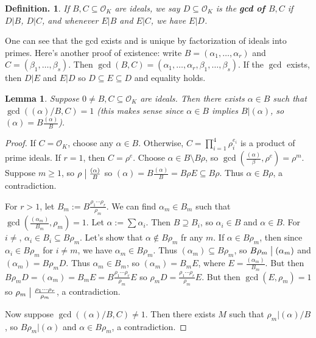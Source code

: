\documentclass[11pt, a4paper]{memoir}
\renewcommand{\div}{\bigm|}
\theoremstyle{change}
\newtheorem{lemma}[theorem]{Lemma}
\theoremstyle{plain}
\theoremstyle{nonumberplain}
\newtheorem{definition}{Definition.}
\newtheorem{proof}{Proof}
\begin{document}
\begin{definition}
    If $B,C\subseteq\mathcal{O}_K$ are ideals, we say $D\subseteq\mathcal{O}_K$ is the \textbf{gcd of $B,C$} if $D|B$, $D|C$, and whenever $E|B$ and $E|C$, we have $E|D$.
\end{definition}
One can see that the gcd exists and is unique by factorization of ideals into primes.
Here's another proof of existence: write $B=(\alpha_1,\ldots,\alpha_r)$ and $C=(\beta_1,\ldots,\beta_s)$.
Then $\gcd(B,C)=(\alpha_1,\ldots,\alpha_r,\beta_1,\ldots,\beta_s)$.
If the $\gcd$ exists, then $D|E$ and $E|D$ so $D\subseteq E\subseteq D$ and equality holds.
\begin{lemma}
    Suppose $0\neq B,C\subseteq\mathcal{O}_K$ are ideals.
    Then there exists $\alpha\in B$ such that $\gcd((\alpha)/B,C)=1$ (this makes sense since $\alpha\in B$ implies $B|(\alpha)$, so $(\alpha)=B\frac{(\alpha)}{B}$).
\end{lemma}
\begin{proof}
    If $C=\mathcal{O}_K$, choose any $\alpha\in B$.
    Otherwise, $C=\prod_{i=1}^4\rho_i^{e_i}$ is a product of prime ideals.
    If $r=1$, then $C=\rho^e$.
    Choose $\alpha\in B\setminus B\rho$, so $\gcd\left(\frac{(\alpha)}{\beta},\rho^e\right)=\rho^m$.
    Suppose $m\geq 1$, so $\rho\div\frac{(\alpha)}{B}$ so $(\alpha)=B\frac{(\alpha)}{B}=B\rho E\subseteq B\rho$.
    Thus $\alpha\in B\rho$, a contradiction.

    For $r>1$, let $B_m:=B\frac{\rho_1\cdots\rho_r}{\rho_m}$.
    We can find $\alpha_m\in B_m$ such that $\gcd\left(\frac{(\alpha_m)}{B_m},\rho_m\right)=1$.
    Let $\alpha:=\sum\alpha_i$.
    Then $B\supseteq B_i$, so $\alpha_i\in B$ and $\alpha\in B$.
    For $i\neq $, $\alpha_i\in B_i\subseteq B\rho_m$.
    Let's show that $\alpha\notin B\rho_m$ fr any $m$.
    If $\alpha\in B\rho_m$, then since $\alpha_i\in B\rho_m$ for $i\neq m$, we have $\alpha_m\in B\rho_m$.
    Thus $(\alpha_m)\subseteq B\rho_m$, so $B\rho_m\div(\alpha_m)$ and $(\alpha_m)=B\rho_mD$.
    Thus $\alpha_m\in B_m$, so $(\alpha_m)=B_mE$, where $E=\frac{(\alpha_m)}{B_m}$.
    But then $B\rho_mD=(\alpha_m)=B_mE=B\frac{\rho_1\cdots\rho_r}{\rho_m}E$ so $\rho_mD=\frac{\rho_1\cdots\rho_r}{\rho_m}E$.
    But then $\gcd(E,\rho_m)=1$ so $\rho_m\div\frac{\rho_1\cdots\rho_r}{\rho_m}$, a contradiction.

    Now suppose $\gcd((\alpha)/B,C)\neq 1$.
    Then there exists $M$ such that $\rho_m|(\alpha)/B$, so $B\rho_m|(\alpha)$ and $\alpha\in B\rho_m$, a contradiction.
\end{proof}
\end{document}

